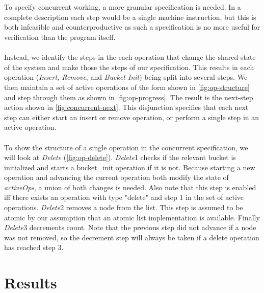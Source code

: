 \documentclass{uit-thesis}
\begin{document}
\\\\
To specify concurrent working, a more granular specification is needed. In a complete description each step would be a single machine instruction, but this is both infeasible and counterproductive as such a specification is no more useful for verification than the program itself.
\\\\
Instead, we identify the steps in the each operation that change the shared state of the system and make those the steps of our specification. This results in each operation (\textit{Insert, Remove}, and \textit{Bucket Init}) being split into several steps. We then maintain a set of active operations of the form shown in \autoref{fig:op-structure} and step through them as shown in \autoref{fig:op-progress}. The result is the next-step action shown in \autoref{fig:concurrent-next}. This disjunction specifies that each next step can either start an insert or remove operation, or perform a single step in an active operation.
\\\\
To show the structure of a single operation in the concurrent specification, we will look at \textit{Delete} (\autoref{fig:op-delete}). \textit{Delete}1 checks if the relevant bucket is initialized and starts a bucket\_init operation if it is not. Because starting a new operation and advancing the current operation both modify the state of \textit{activeOps}, a union of both changes is needed. Also note that this step is enabled iff there exists an operation with type "delete" and step 1 in the set of active operations. \textit{Delete}2 removes a node from the list. This step is assumed to be atomic by our assumption that an atomic list implementation is available. Finally \textit{Delete}3 decrements count. Note that the previous step did not advance if a node was not removed, so the decrement step will always be taken if a delete operation has reached step 3.

\chapter{Results}\label{ch:results}
\end{document}

